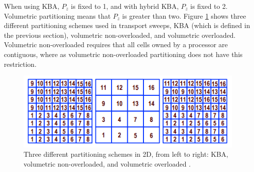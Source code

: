 \documentclass{anstrans}
\begin{document}
When using KBA, $P_z$ is fixed to 1, and with hybrid KBA, $P_z$ is fixed to 2. Volumetric partitioning means that $P_z$ is greater than two. Figure \ref{partitioning} shows three different partitioning schemes used in transport sweeps, KBA (which is defined in the previous section), volumetric non-overloaded, and volumetric overloaded. Volumetric non-overloaded requires that all cells owned by a processor are contiguous, where as volumetric non-overloaded partitioning does not have this restriction.  

\begin{figure}
\centering
\includegraphics[scale = 0.75]{figures/Partitioning.png}
\caption{Three different partitioning schemes in 2D, from left to right: KBA, volumetric non-overloaded, and volumetric overloaded \cite{mpadams2015}.}
\label{partitioning}
\end{figure}
\end{document}
